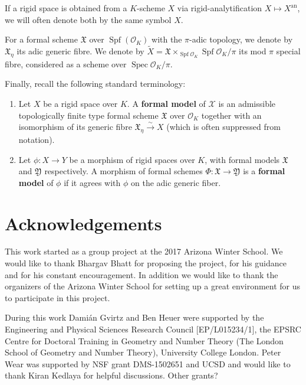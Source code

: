 \documentclass[10pt,oneside]{amsart}
\theoremstyle{definition}
\begin{document}
	If a rigid space is obtained from a $K$-scheme $X$ via rigid-analytification $X\mapsto X^{\operatorname{an}}$, we will often denote both by the same symbol $X$.
 
	For a formal scheme $\mathfrak X$ over $\operatorname{Spf}(\mathcal O_K)$ with the $\pi$-adic topology, we denote by $\mathfrak X_\eta$ its adic generic fibre. 
	We denote by $\tilde{X}=\mathfrak X\times_{\operatorname{Spf}\mathcal O_K}\operatorname{Spf}\mathcal O_K/\pi$ its mod $\pi$ special fibre, considered as a scheme over $\operatorname{Spec}\mathcal O_K/\pi$. 

	Finally, recall the following standard terminology: 
		\begin{enumerate}
			\item Let $X$ be a rigid space over $K$. A \textbf{formal model} of $\mathcal X$ is an admissible topologically finite type formal scheme $\mathfrak X$ over $\mathcal O_K$ together with an isomorphism of its generic fibre $\mathfrak X_\eta \xrightarrow{\sim} X$ (which is often suppressed from notation).
			\item Let $\phi:  X\rightarrow  Y$ be a morphism of rigid spaces over $K$, with formal models $\mathfrak X$ and $\mathfrak Y$	respectively. A morphism of formal schemes $\Phi:\mathfrak X \rightarrow \mathfrak Y$ is a \textbf{formal model} of $\phi$ if it agrees with $\phi$ on the adic generic fiber. 
		\end{enumerate}




\section*{Acknowledgements}
This work started as a group project at the 2017 Arizona Winter School. We would like to thank Bhargav Bhatt for proposing the project, for his guidance and for his constant encouragement. In addition we would like to thank the organizers of the Arizona Winter School for setting up a great environment for us to participate in this project. 

During this work Dami\'an Gvirtz and Ben Heuer were supported by the Engineering and Physical Sciences Research Council [EP/L015234/1], the EPSRC Centre for Doctoral Training in Geometry and Number Theory (The London School of Geometry and Number Theory), University College London. 
Peter Wear was supported by NSF grant DMS-1502651 and UCSD and would like to thank Kiran Kedlaya for helpful discussions.
{\color{red} Other grants?}
\end{document}
